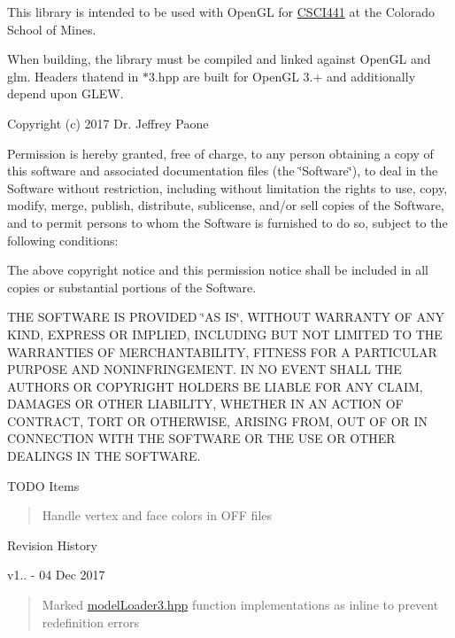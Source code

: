 This library is intended to be used with Open\+GL for \hyperlink{namespace_c_s_c_i441}{C\+S\+C\+I441} at the Colorado School of Mines.

When building, the library must be compiled and linked against Open\+GL and glm. Headers thatend in $\ast$3.hpp are built for Open\+GL 3.+ and additionally depend upon G\+L\+EW.

Copyright (c) 2017 Dr. Jeffrey Paone

Permission is hereby granted, free of charge, to any person obtaining a copy of this software and associated documentation files (the \char`\"{}\+Software\char`\"{}), to deal in the Software without restriction, including without limitation the rights to use, copy, modify, merge, publish, distribute, sublicense, and/or sell copies of the Software, and to permit persons to whom the Software is furnished to do so, subject to the following conditions\+:

The above copyright notice and this permission notice shall be included in all copies or substantial portions of the Software.

T\+HE S\+O\+F\+T\+W\+A\+RE IS P\+R\+O\+V\+I\+D\+ED \char`\"{}\+A\+S I\+S\char`\"{}, W\+I\+T\+H\+O\+UT W\+A\+R\+R\+A\+N\+TY OF A\+NY K\+I\+ND, E\+X\+P\+R\+E\+SS OR I\+M\+P\+L\+I\+ED, I\+N\+C\+L\+U\+D\+I\+NG B\+UT N\+OT L\+I\+M\+I\+T\+ED TO T\+HE W\+A\+R\+R\+A\+N\+T\+I\+ES OF M\+E\+R\+C\+H\+A\+N\+T\+A\+B\+I\+L\+I\+TY, F\+I\+T\+N\+E\+SS F\+OR A P\+A\+R\+T\+I\+C\+U\+L\+AR P\+U\+R\+P\+O\+SE A\+ND N\+O\+N\+I\+N\+F\+R\+I\+N\+G\+E\+M\+E\+NT. IN NO E\+V\+E\+NT S\+H\+A\+LL T\+HE A\+U\+T\+H\+O\+RS OR C\+O\+P\+Y\+R\+I\+G\+HT H\+O\+L\+D\+E\+RS BE L\+I\+A\+B\+LE F\+OR A\+NY C\+L\+A\+IM, D\+A\+M\+A\+G\+ES OR O\+T\+H\+ER L\+I\+A\+B\+I\+L\+I\+TY, W\+H\+E\+T\+H\+ER IN AN A\+C\+T\+I\+ON OF C\+O\+N\+T\+R\+A\+CT, T\+O\+RT OR O\+T\+H\+E\+R\+W\+I\+SE, A\+R\+I\+S\+I\+NG F\+R\+OM, O\+UT OF OR IN C\+O\+N\+N\+E\+C\+T\+I\+ON W\+I\+TH T\+HE S\+O\+F\+T\+W\+A\+RE OR T\+HE U\+SE OR O\+T\+H\+ER D\+E\+A\+L\+I\+N\+GS IN T\+HE S\+O\+F\+T\+W\+A\+RE.

T\+O\+DO Items \begin{quote}
Handle vertex and face colors in O\+FF files \end{quote}


Revision History

v1.. -\/ 04 Dec 2017 \begin{quote}
Marked \hyperlink{model_loader3_8hpp}{model\+Loader3.\+hpp} function implementations as inline to prevent redefinition errors \end{quote}


